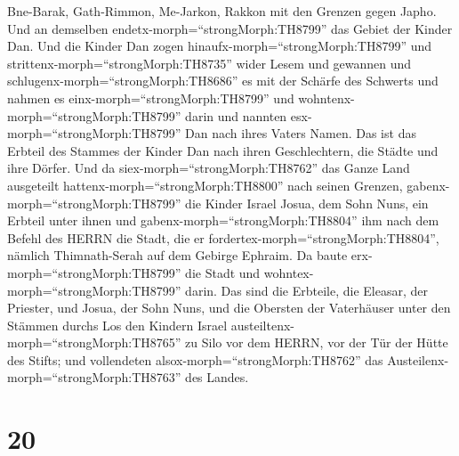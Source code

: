 Bne-Barak, Gath-Rimmon,  Me-Jarkon, Rakkon mit den Grenzen
gegen Japho.  Und an demselben
endetx-morph=``strongMorph:TH8799'' das Gebiet der Kinder Dan. Und die
Kinder Dan zogen hinaufx-morph=``strongMorph:TH8799'' und
strittenx-morph=``strongMorph:TH8735'' wider Lesem und gewannen und
schlugenx-morph=``strongMorph:TH8686'' es mit der Schärfe des Schwerts
und nahmen es einx-morph=``strongMorph:TH8799'' und
wohntenx-morph=``strongMorph:TH8799'' darin und nannten
esx-morph=``strongMorph:TH8799'' Dan nach ihres Vaters Namen.
 Das ist das Erbteil des Stammes der Kinder Dan nach ihren
Geschlechtern, die Städte und ihre Dörfer.  Und da
siex-morph=``strongMorph:TH8762'' das Ganze Land ausgeteilt
hattenx-morph=``strongMorph:TH8800'' nach seinen Grenzen,
gabenx-morph=``strongMorph:TH8799'' die Kinder Israel Josua, dem Sohn
Nuns, ein Erbteil unter ihnen  und
gabenx-morph=``strongMorph:TH8804'' ihm nach dem Befehl des HERRN die
Stadt, die er fordertex-morph=``strongMorph:TH8804'', nämlich
Thimnath-Serah auf dem Gebirge Ephraim. Da baute
erx-morph=``strongMorph:TH8799'' die Stadt und
wohntex-morph=``strongMorph:TH8799'' darin.  Das sind die
Erbteile, die Eleasar, der Priester, und Josua, der Sohn Nuns, und die
Obersten der Vaterhäuser unter den Stämmen durchs Los den Kindern Israel
austeiltenx-morph=``strongMorph:TH8765'' zu Silo vor dem HERRN, vor der
Tür der Hütte des Stifts; und vollendeten
alsox-morph=``strongMorph:TH8762'' das
Austeilenx-morph=``strongMorph:TH8763'' des Landes.

\hypertarget{section-19}{%
\section{20}\label{section-19}}

